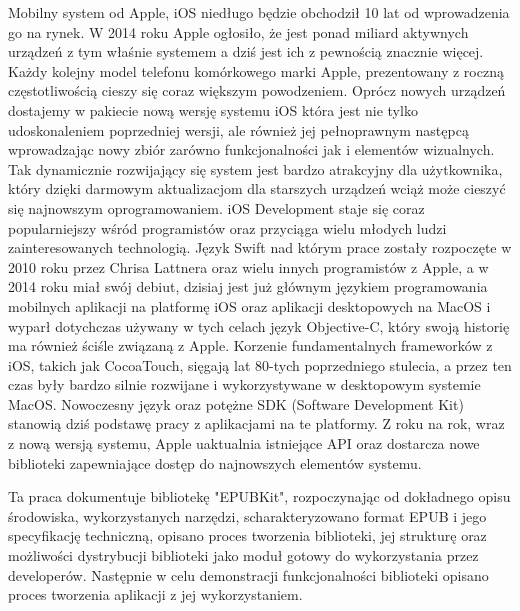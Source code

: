 Mobilny system od Apple, iOS niedługo będzie obchodził 10 lat od wprowadzenia go na rynek. W 2014 roku Apple ogłosiło, że jest ponad miliard aktywnych urządzeń z tym właśnie systemem a dziś jest ich z pewnością znacznie więcej. Każdy kolejny model telefonu komórkowego marki Apple, prezentowany z roczną częstotliwością cieszy się coraz większym powodzeniem. Oprócz nowych urządzeń dostajemy w pakiecie nową wersję systemu iOS która jest nie tylko udoskonaleniem poprzedniej wersji, ale również jej pełnoprawnym następcą wprowadzając nowy zbiór zarówno funkcjonalności jak i elementów wizualnych. Tak dynamicznie rozwijający się system jest bardzo atrakcyjny dla użytkownika, który dzięki darmowym aktualizacjom dla starszych urządzeń wciąż może cieszyć się najnowszym oprogramowaniem. iOS Development staje się coraz popularniejszy wśród programistów oraz przyciąga wielu młodych ludzi zainteresowanych technologią. Język Swift nad którym prace zostały rozpoczęte w 2010 roku przez Chrisa Lattnera oraz wielu innych programistów z Apple, a w 2014 roku miał swój debiut, dzisiaj jest już głównym językiem programowania mobilnych aplikacji na platformę iOS oraz aplikacji desktopowych na MacOS i wyparł dotychczas używany w tych celach język Objective-C, który swoją historię ma również ściśle związaną z Apple. Korzenie fundamentalnych frameworków z iOS, takich jak CocoaTouch, sięgają lat 80-tych poprzedniego stulecia, a przez ten czas były bardzo silnie rozwijane i wykorzystywane w desktopowym systemie MacOS. Nowoczesny język oraz potężne SDK (Software Development Kit) stanowią dziś podstawę pracy z aplikacjami na te platformy. Z roku na rok, wraz z nową wersją systemu, Apple uaktualnia istniejące API oraz dostarcza nowe biblioteki zapewniające dostęp do najnowszych elementów systemu.

Ta praca dokumentuje bibliotekę "EPUBKit", rozpoczynając od dokładnego opisu środowiska, wykorzystanych narzędzi, scharakteryzowano format EPUB i jego specyfikację techniczną, opisano proces tworzenia biblioteki, jej strukturę oraz możliwości dystrybucji biblioteki jako moduł gotowy do wykorzystania przez developerów. Następnie w celu demonstracji funkcjonalności biblioteki opisano proces tworzenia aplikacji z jej wykorzystaniem.
